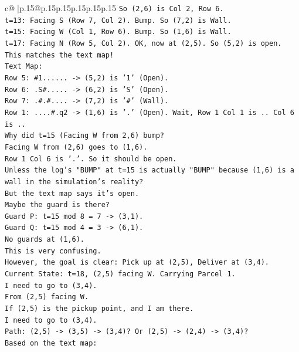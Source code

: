 \documentclass{article}
\begin{document}
{\begin{supertabular}{c@{$\;$}|p{.15\linewidth}@{}p{.15\linewidth}p{.15\linewidth}p{.15\linewidth}p{.15\linewidth}p{.15\linewidth}}
{{{\texttt{So (2,6) is Col 2, Row 6.} \\
\texttt{t=13: Facing S (Row 7, Col 2). Bump. So (7,2) is Wall.} \\
\texttt{t=15: Facing W (Col 1, Row 6). Bump. So (1,6) is Wall.} \\
\texttt{t=17: Facing N (Row 5, Col 2). OK, now at (2,5). So (5,2) is open.} \\
\texttt{This matches the text map!} \\
\texttt{Text Map:} \\
\texttt{Row 5: \#1...... {-}> (5,2) is '1' (Open).} \\
\texttt{Row 6: .S\#..... {-}> (6,2) is 'S' (Open).} \\
\texttt{Row 7: .\#.\#.... {-}> (7,2) is '\#' (Wall).} \\
\texttt{Row 1: ....\#.q2 {-}> (1,6) is '.' (Open). Wait, Row 1 Col 1 is .. Col 6 is ..} \\
\texttt{Why did t=15 (Facing W from 2,6) bump?} \\
\texttt{Facing W from (2,6) goes to (1,6).} \\
\texttt{Row 1 Col 6 is '.'. So it should be open.} \\
\texttt{Unless the log's "BUMP" at t=15 is actually "BUMP" because (1,6) is a wall in the simulation's reality?} \\
\texttt{But the text map says it's open.} \\
\texttt{Maybe the guard is there?} \\
\texttt{Guard P: t=15 mod 8 = 7 {-}> (3,1).} \\
\texttt{Guard Q: t=15 mod 4 = 3 {-}> (6,1).} \\
\texttt{No guards at (1,6).} \\
\texttt{This is very confusing.} \\
\texttt{However, the goal is clear: Pick up at (2,5), Deliver at (3,4).} \\
\texttt{Current State: t=18, (2,5) facing W. Carrying Parcel 1.} \\
\texttt{I need to go to (3,4).} \\
\texttt{From (2,5) facing W.} \\
\texttt{If (2,5) is the pickup point, and I am there.} \\
\texttt{I need to go to (3,4).} \\
\texttt{Path: (2,5) {-}> (3,5) {-}> (3,4)? Or (2,5) {-}> (2,4) {-}> (3,4)?} \\
\texttt{Based on the text map:} \\
}}}
\end{supertabular}}
\end{document}
